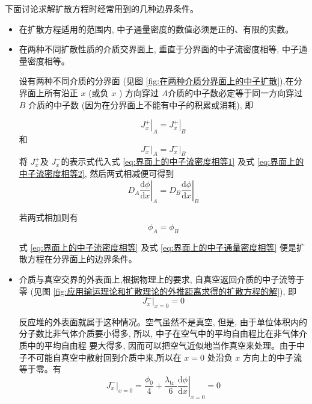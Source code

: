 \documentclass{Sichuan Normal University}
\begin{document}
下面讨论求解扩散方程时经常用到的几种边界条件。
\begin{itemize} 
    \item 在扩散方程适用的范围内, 中子通量密度的数值必须是正的、有限的实数。

    \item 在两种不同扩散性质的介质交界面上, 垂直于分界面的中子流密度相等, 中子通量密度相等。

设有两种不同介质的分界面 (见图 \ref{fig:在两种介质分界面上的中子扩散}),在分界面上所有沿正 $x$ (或负 $x$ ) 方向穿过 $A$介质的中子数必定等于同一方向穿过 $B$ 介质的中子数 (因为在分界面上不能有中子的积累或消耗), 即

\begin{equation}
\left.J_x^{+}\right|_A=\left.J_x^{+}\right|_B
\label{eq:界面上的中子流密度相等1}
\end{equation}
和
\begin{equation}
\left.J_x^{-}\right|_A=\left.J_x^{-}\right|_B
\label{eq:界面上的中子流密度相等2}
\end{equation}
将 $J_x^{+}$及 $J_x^{-}$的表示式代入式 \eqref{eq:界面上的中子流密度相等1} 及式 \eqref{eq:界面上的中子流密度相等2}, 然后两式相减便可得到
\begin{equation}
\left.D_A \frac{\mathrm{d} \phi}{\mathrm{d} x}\right|_A=\left.D_B \frac{\mathrm{d} \phi}{\mathrm{d} x}\right|_B
\label{eq:界面上的中子流密度相等}
\end{equation}

若两式相加则有
\begin{equation}
\phi_A=\phi_B
\label{eq:界面上的中子通量密度相等}
\end{equation}

式  \eqref{eq:界面上的中子流密度相等} 及式 \eqref{eq:界面上的中子通量密度相等} 便是扩散方程在分界面上的边界条件。

\item 介质与真空交界的外表面上,根据物理上的要求, 自真空返回介质的中子流等于零 (见图 \ref{fig:应用输运理论和扩散理论的外推距离求得的扩散方程的解}), 即
\begin{equation}
\left.J_x^{-}\right|_{x=0}=0
\end{equation}

反应堆的外表面就属于这种情况。空气虽然不是真空, 但是, 由于单位体积内的分子数比非气体介质要小得多, 所以, 中子在空气中的平均自由程比在非气体介质中的平均自由程
要大得多, 因而可以把空气近似地当作真空来处理。由于中子不可能自真空中散射回到介质中来,所以在 $x=0$ 处沿负 $x$ 方向上的中子流等于零。有
\begin{equation}
\left.J_x^{-}\right|_{x=0}=\frac{\phi_0}{4}+\left.\frac{\lambda_{\text {tr }}}{6} \frac{\mathrm{d} \phi}{\mathrm{d} x}\right|_{x=0}=0
\end{equation}


\end{itemize}
\end{document}
